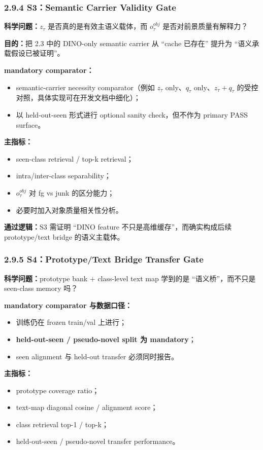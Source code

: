 \documentclass[UTF8]{ctexart}
\begin{document}
\subsubsection*{2.9.4 S3：Semantic Carrier Validity Gate}
\textbf{科学问题：}$z_\tau$ 是否真的是有效主语义载体，而 $o_\tau^{obj}$ 是否对前景质量有解释力？

\textbf{目的：}把 2.3 中的 DINO-only semantic carrier 从 ``cache 已存在'' 提升为 ``语义承载假设已被证明''。

\textbf{mandatory comparator：}
\begin{itemize}
\item semantic-carrier necessity comparator（例如 $z_\tau$ only、$q_\tau$ only、$z_\tau+q_\tau$ 的受控对照，具体实现可在开发文档中细化）；
\item 以 held-out-seen 形式进行 optional sanity check，但不作为 primary PASS surface。
\end{itemize}

\textbf{主指标：}
\begin{itemize}
\item seen-class retrieval / top-k retrieval；
\item intra/inter-class separability；
\item $o_\tau^{obj}$ 对 fg vs junk 的区分能力；
\item 必要时加入对象质量相关性分析。
\end{itemize}

\textbf{通过逻辑：}S3 需证明 ``DINO feature 不只是高维缓存''，而确实构成后续 prototype/text bridge 的语义主载体。

\subsubsection*{2.9.5 S4：Prototype/Text Bridge Transfer Gate}
\textbf{科学问题：}prototype bank + class-level text map 学到的是 ``语义桥''，而不只是 seen-class memory 吗？

\textbf{mandatory comparator 与数据口径：}
\begin{itemize}
\item 训练仍在 frozen train/val 上进行；
\item \textbf{held-out-seen / pseudo-novel split 为 mandatory}；
\item seen alignment 与 held-out transfer 必须同时报告。
\end{itemize}

\textbf{主指标：}
\begin{itemize}
\item prototype coverage ratio；
\item text-map diagonal cosine / alignment score；
\item class retrieval top-1 / top-k；
\item held-out-seen / pseudo-novel transfer performance。
\end{itemize}
\end{document}
